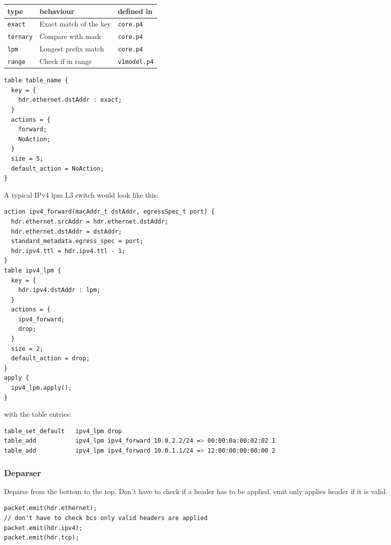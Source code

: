 \documentclass[a4paper, fontsize=8pt, landscape, DIV=1]{scrartcl}
\begin{document}
\begin{multicols*}{3}
  \begin{tabularx}{\linewidth}{ l X l}
  \hline type & behaviour & defined in \\ \hline
    \lstinline[style=P4style]!exact! &
    Exact match of the key & \texttt{core.p4} \\
    \lstinline[style=P4style]!ternary! &
    Compare with mask & \texttt{core.p4} \\
    \lstinline[style=P4style]!lpm! &
    Longest prefix match & \texttt{core.p4} \\
    \lstinline[style=P4style]!range! &
    Check if in range & \texttt{v1model.p4} \\ \hline
  \end{tabularx}

  \begin{lstlisting}[style=P4style]
table table_name {
  key = {
    hdr.ethernet.dstAddr : exact;
  }
  actions = {
    forward;
    NoAction;
  }
  size = 5;
  default_action = NoAction;
}\end{lstlisting}

A typical IPv4 lpm L3 switch would look like this:
  \begin{lstlisting}[style=P4style]
action ipv4_forward(macAddr_t dstAddr, egressSpec_t port) {
  hdr.ethernet.srcAddr = hdr.ethernet.dstAddr;
  hdr.ethernet.dstAddr = dstAddr;
  standard_metadata.egress_spec = port;
  hdr.ipv4.ttl = hdr.ipv4.ttl - 1;
}
table ipv4_lpm {
  key = {
    hdr.ipv4.dstAddr : lpm;
  }
  actions = {
    ipv4_forward;
    drop;
  }
  size = 2;
  default_action = drop;
}
apply {
  ipv4_lpm.apply();
}\end{lstlisting}

with the table entries:
\begin{lstlisting}[language=bash]
table_set_default   ipv4_lpm drop
table_add           ipv4_lpm ipv4_forward 10.0.2.2/24 => 00:00:0a:00:02:02 1
table_add           ipv4_lpm ipv4_forward 10.0.1.1/24 => 12:00:00:00:00:00 2\end{lstlisting}

  \subsubsection{Deparser}
  Deparse from the bottom to the top. Don’t have to check if a header has to be applied, emit only applies header if it is valid.
  \begin{lstlisting}[style=P4style]
packet.emit(hdr.ethernet);
// don't have to check bcs only valid headers are applied
packet.emit(hdr.ipv4);
packet.emit(hdr.tcp);\end{lstlisting}


\end{multicols*}
\end{document}
